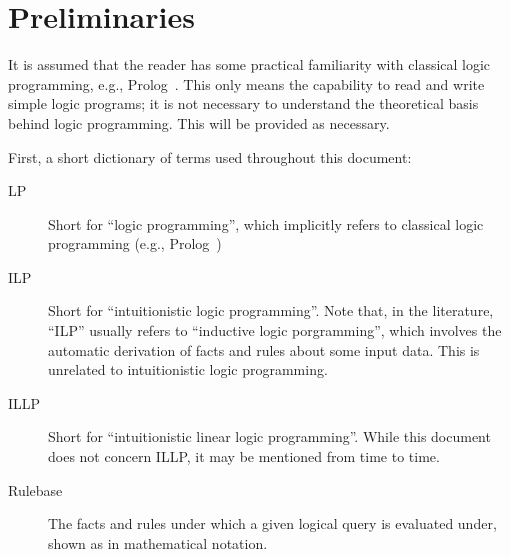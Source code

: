 \section{Preliminaries}

It is assumed that the reader has some practical familiarity with classical logic programming, e.g., Prolog~\cite{roussel1975prolog, Warren:1977:PLI:872736.806939}.
This only means the capability to read and write simple logic programs; it is not necessary to understand the theoretical basis behind logic programming.
This will be provided as necessary.

First, a short dictionary of terms used throughout this document:

\begin{description}
  \item[LP] Short for ``logic programming'', which implicitly refers to classical logic programming (e.g., Prolog~\cite{roussel1975prolog, Warren:1977:PLI:872736.806939})

  \item[ILP] Short for ``intuitionistic logic programming''.
    Note that, in the literature, ``ILP'' usually refers to ``inductive logic porgramming'', which involves the automatic derivation of facts and rules about some input data.
    This is unrelated to intuitionistic logic programming.

  \item[ILLP] Short for ``intuitionistic linear logic programming''.
    While this document does not concern ILLP, it may be mentioned from time to time.

  \item[Rulebase] The facts and rules under which a given logical query is evaluated under, shown as  in mathematical notation.
\end{description}

